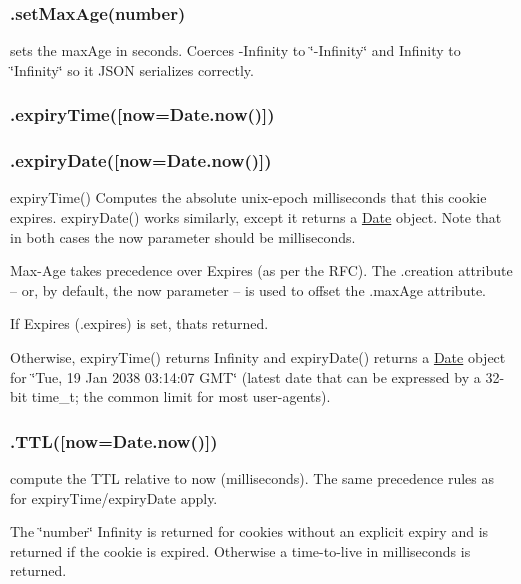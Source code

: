 \subsubsection*{{\ttfamily .set\+Max\+Age(number)}}

sets the max\+Age in seconds. Coerces {\ttfamily -\/\+Infinity} to {\ttfamily \char`\"{}-\/\+Infinity\char`\"{}} and {\ttfamily Infinity} to {\ttfamily \char`\"{}\+Infinity\char`\"{}} so it J\+S\+ON serializes correctly.

\subsubsection*{{\ttfamily .expiry\+Time(\mbox{[}now=Date.\+now()\mbox{]})}}

\subsubsection*{{\ttfamily .expiry\+Date(\mbox{[}now=Date.\+now()\mbox{]})}}

expiry\+Time() Computes the absolute unix-\/epoch milliseconds that this cookie expires. expiry\+Date() works similarly, except it returns a {\ttfamily \mbox{\hyperlink{classDate}{Date}}} object. Note that in both cases the {\ttfamily now} parameter should be milliseconds.

Max-\/\+Age takes precedence over Expires (as per the R\+FC). The {\ttfamily .creation} attribute -- or, by default, the {\ttfamily now} parameter -- is used to offset the {\ttfamily .max\+Age} attribute.

If Expires ({\ttfamily .expires}) is set, that\textquotesingle{}s returned.

Otherwise, {\ttfamily expiry\+Time()} returns {\ttfamily Infinity} and {\ttfamily expiry\+Date()} returns a {\ttfamily \mbox{\hyperlink{classDate}{Date}}} object for \char`\"{}\+Tue, 19 Jan 2038 03\+:14\+:07 G\+M\+T\char`\"{} (latest date that can be expressed by a 32-\/bit {\ttfamily time\+\_\+t}; the common limit for most user-\/agents).

\subsubsection*{{\ttfamily .T\+TL(\mbox{[}now=Date.\+now()\mbox{]})}}

compute the T\+TL relative to {\ttfamily now} (milliseconds). The same precedence rules as for {\ttfamily expiry\+Time}/{\ttfamily expiry\+Date} apply.

The \char`\"{}number\char`\"{} {\ttfamily Infinity} is returned for cookies without an explicit expiry and {} is returned if the cookie is expired. Otherwise a time-\/to-\/live in milliseconds is returned.

